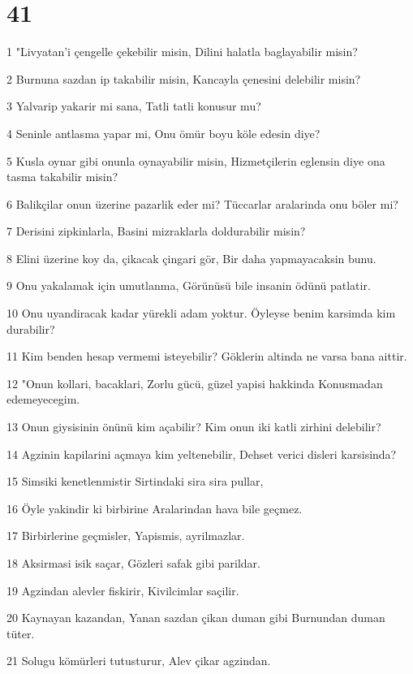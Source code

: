 \chapter{41}

\par 1 "Livyatan'i çengelle çekebilir misin, Dilini halatla baglayabilir misin?
\par 2 Burnuna sazdan ip takabilir misin, Kancayla çenesini delebilir misin?
\par 3 Yalvarip yakarir mi sana, Tatli tatli konusur mu?
\par 4 Seninle antlasma yapar mi, Onu ömür boyu köle edesin diye?
\par 5 Kusla oynar gibi onunla oynayabilir misin, Hizmetçilerin eglensin diye ona tasma takabilir misin?
\par 6 Balikçilar onun üzerine pazarlik eder mi? Tüccarlar aralarinda onu böler mi?
\par 7 Derisini zipkinlarla, Basini mizraklarla doldurabilir misin?
\par 8 Elini üzerine koy da, çikacak çingari gör, Bir daha yapmayacaksin bunu.
\par 9 Onu yakalamak için umutlanma, Görünüsü bile insanin ödünü patlatir.
\par 10 Onu uyandiracak kadar yürekli adam yoktur. Öyleyse benim karsimda kim durabilir?
\par 11 Kim benden hesap vermemi isteyebilir? Göklerin altinda ne varsa bana aittir.
\par 12 "Onun kollari, bacaklari, Zorlu gücü, güzel yapisi hakkinda Konusmadan edemeyecegim.
\par 13 Onun giysisinin önünü kim açabilir? Kim onun iki katli zirhini delebilir?
\par 14 Agzinin kapilarini açmaya kim yeltenebilir, Dehset verici disleri karsisinda?
\par 15 Simsiki kenetlenmistir Sirtindaki sira sira pullar,
\par 16 Öyle yakindir ki birbirine Aralarindan hava bile geçmez.
\par 17 Birbirlerine geçmisler, Yapismis, ayrilmazlar.
\par 18 Aksirmasi isik saçar, Gözleri safak gibi parildar.
\par 19 Agzindan alevler fiskirir, Kivilcimlar saçilir.
\par 20 Kaynayan kazandan, Yanan sazdan çikan duman gibi Burnundan duman tüter.
\par 21 Solugu kömürleri tutusturur, Alev çikar agzindan.

